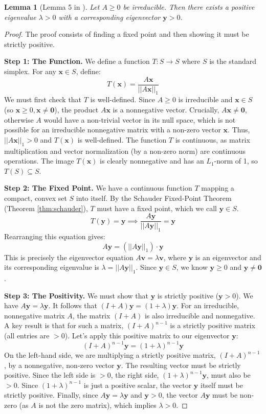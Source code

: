 \documentclass[12pt,a4paper]{report}
\theoremstyle{plain}
\newtheorem{lemma}[theorem]{Lemma}
\theoremstyle{definition}
\theoremstyle{remark}
\begin{document}
\begin{lemma}[Lemma 5 in \cite{main_paper}]\label{lem:pf_existence}
Let $A \ge 0$ be irreducible. Then there exists a positive eigenvalue $\lambda > 0$ with a corresponding eigenvector $\bm{y} > 0$.
\end{lemma}
\begin{proof}
The proof consists of finding a fixed point and then showing it must be strictly positive.

\textbf{Step 1: The Function.}
We define a function $T: S \to S$ where $S$ is the standard simplex. For any $\bm{x} \in S$, define:
$$ T(\bm{x}) = \frac{A\bm{x}}{||A\bm{x}||_1} $$
We must first check that $T$ is well-defined. Since $A \ge 0$ is irreducible and $\bm{x} \in S$ (so $\bm{x} \ge 0, \bm{x} \ne \bm{0}$), the product $A\bm{x}$ is a nonnegative vector. Crucially, $A\bm{x} \ne \bm{0}$, otherwise $A$ would have a non-trivial vector in its null space, which is not possible for an irreducible nonnegative matrix with a non-zero vector $\bm{x}$. Thus, $||A\bm{x}||_1 > 0$ and $T(\bm{x})$ is well-defined.
The function $T$ is continuous, as matrix multiplication and vector normalization (by a non-zero norm) are continuous operations. The image $T(\bm{x})$ is clearly nonnegative and has an $L_1$-norm of 1, so $T(S) \subseteq S$.

\textbf{Step 2: The Fixed Point.}
We have a continuous function $T$ mapping a compact, convex set $S$ into itself. By the Schauder Fixed-Point Theorem (Theorem \ref{thm:schauder}), $T$ must have a fixed point, which we call $\bm{y} \in S$.
$$ T(\bm{y}) = \bm{y} \implies \frac{A\bm{y}}{||A\bm{y}||_1} = \bm{y} $$
Rearranging this equation gives:
$$ A\bm{y} = (||A\bm{y}||_1) \cdot \bm{y} $$
This is precisely the eigenvector equation $A\bm{v} = \lambda\bm{v}$, where $\bm{y}$ is an eigenvector and its corresponding eigenvalue is $\lambda = ||A\bm{y}||_1$. Since $\bm{y} \in S$, we know $\bm{y} \ge 0$ and $\bm{y} \ne \bm{0}$.

\textbf{Step 3: The Positivity.}
We must show that $\bm{y}$ is strictly positive ($\bm{y} > 0$).
We have $A\bm{y} = \lambda\bm{y}$. It follows that $(I+A)\bm{y} = (1+\lambda)\bm{y}$.
For an irreducible, nonnegative matrix $A$, the matrix $(I+A)$ is also irreducible and nonnegative. A key result is that for such a matrix, $(I+A)^{n-1}$ is a strictly positive matrix (all entries are $> 0$).
Let's apply this positive matrix to our eigenvector $\bm{y}$:
$$ (I+A)^{n-1}\bm{y} = (1+\lambda)^{n-1}\bm{y} $$
On the left-hand side, we are multiplying a strictly positive matrix, $(I+A)^{n-1}$, by a nonnegative, non-zero vector $\bm{y}$. The resulting vector must be strictly positive.
Since the left side is $> 0$, the right side, $(1+\lambda)^{n-1}\bm{y}$, must also be $> 0$. Since $(1+\lambda)^{n-1}$ is just a positive scalar, the vector $\bm{y}$ itself must be strictly positive.
Finally, since $A\bm{y} = \lambda\bm{y}$ and $\bm{y} > 0$, the vector $A\bm{y}$ must be non-zero (as $A$ is not the zero matrix), which implies $\lambda > 0$.
\end{proof}
\end{document}
